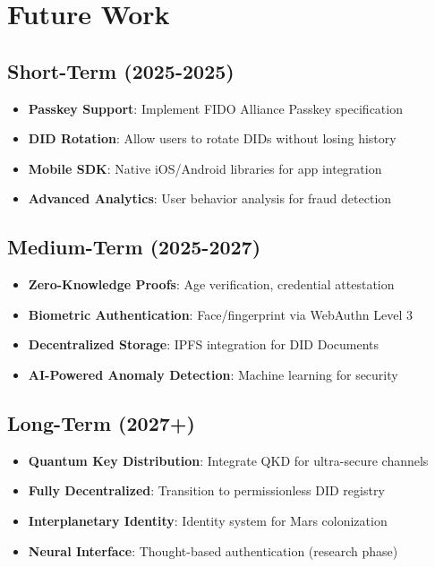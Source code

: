 \section{Future Work}


\subsection{Short-Term (2025-2025)}

\begin{itemize}
  \item \textbf{Passkey Support}: Implement FIDO Alliance Passkey specification
  \item \textbf{DID Rotation}: Allow users to rotate DIDs without losing history
  \item \textbf{Mobile SDK}: Native iOS/Android libraries for app integration
  \item \textbf{Advanced Analytics}: User behavior analysis for fraud detection
\end{itemize}

\subsection{Medium-Term (2025-2027)}

\begin{itemize}
  \item \textbf{Zero-Knowledge Proofs}: Age verification, credential attestation
  \item \textbf{Biometric Authentication}: Face/fingerprint via WebAuthn Level 3
  \item \textbf{Decentralized Storage}: IPFS integration for DID Documents
  \item \textbf{AI-Powered Anomaly Detection}: Machine learning for security
\end{itemize}

\subsection{Long-Term (2027+)}

\begin{itemize}
  \item \textbf{Quantum Key Distribution}: Integrate QKD for ultra-secure channels
  \item \textbf{Fully Decentralized}: Transition to permissionless DID registry
  \item \textbf{Interplanetary Identity}: Identity system for Mars colonization
  \item \textbf{Neural Interface}: Thought-based authentication (research phase)
\end{itemize}

